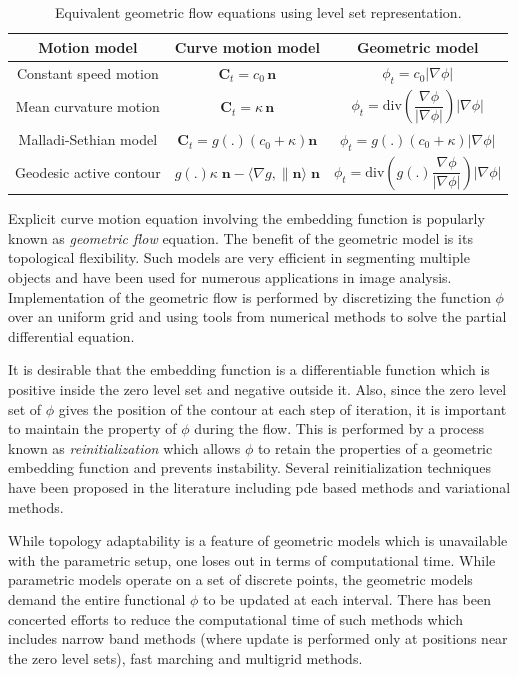 \begin{table}[bht]
\centering
\caption[Geometric Flow]{Equivalent geometric flow equations using level set representation.}
\begin{tabular}{c|c|c}
Motion model & Curve motion model & Geometric model \\
\hline \hline 
Constant speed motion & $\textbf{C}_t=c_0\, \textbf{n}$ & $\phi_t=c_0|\nabla
\phi|$ \\
Mean curvature motion & $\textbf{C}_t=\kappa\, \textbf{n}$ & $\phi_t=\text{div}\left(\dfrac{\nabla\phi}{|\nabla\phi|}\right)|\nabla
\phi|$ \\
Malladi-Sethian model & $\textbf{C}_t=g(.)\left(c_0+\kappa\right) \textbf{n}$ & $\phi_t=g(.)\left(c_0+\kappa\right)|\nabla
\phi|$ \\
Geodesic active contour & $g(.)\kappa\;\textbf{n}-\langle\nabla g,\|\textbf{n} \rangle \;\textbf{n}$ & $\phi_t= \text{div}\left(g(.)\dfrac{\nabla\phi}{|\nabla\phi|}\right)|\nabla\phi|$\\
\hline
\end{tabular}
\label{table:geometric_flow}
\end{table}
Explicit curve motion equation involving the embedding function is popularly known as \textit{geometric flow} equation. The benefit of the geometric model is its topological flexibility. Such models are very efficient in segmenting multiple objects and have been used for numerous applications in image analysis. Implementation of the geometric flow is performed by discretizing the function $\phi$ over an uniform grid and using tools from numerical methods to solve the partial differential equation. 

It is desirable that the embedding function is a differentiable function which is positive inside the zero level set and negative outside it. Also, since the zero level set of $\phi$ gives the position of the contour at each step of iteration, it is important to maintain the property of $\phi$ during the flow. This is performed by a process known as \textit{reinitialization} which allows $\phi$ to retain the properties of a geometric embedding function and  prevents instability. Several reinitialization techniques have been proposed in the literature including pde based methods and variational methods\cite{osher_sethian,caselles_geodesic,li_without_reinit_CVPR,li_DRLS}. 


While topology adaptability is a feature of geometric models which is unavailable with the parametric setup, one loses out in terms of computational time. While parametric models operate on a set of discrete points, the geometric models demand the entire functional $\phi$ to be updated at each interval. There has been concerted efforts to reduce the computational time of such methods which includes narrow band methods (where update is performed only at positions near the zero level sets), fast marching and multigrid methods\cite{malladi_sethian,papandreou2007multigrid,goldenberg2001fast,sethian1999fast,shi2008real}. 

